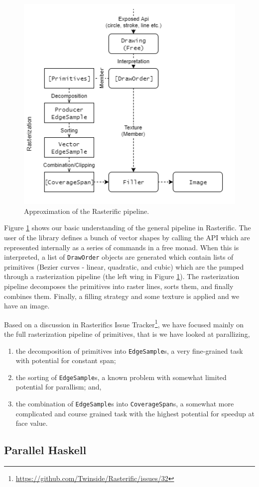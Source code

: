 \documentclass[12pt, a4paper]{article}
\begin{document}
\begin{figure}[h!]
  \centering
  \includegraphics[width=.4\linewidth]{../rasterific-pipeline}
  \caption{Approximation of the Rasterific pipeline.}
  \label{fig:rasterific-pipeline}
\end{figure}

Figure \ref{fig:rasterific-pipeline} shows our basic understanding of the general pipeline in Rasterific. The user of the library defines a bunch of vector shapes by calling the
API which are represented internally as a series of commands in a free monad. When this is interpreted, a list of \texttt{DrawOrder} objects are generated which contain lists
of primitives (Bezier curves - linear, quadratic, and cubic) which are the pumped through a rasterization pipeline (the left wing in Figure \ref{fig:rasterific-pipeline}). The rasterization
pipeline decomposes the primitives into raster lines, sorts them, and finally combines them. Finally, a filling strategy and some texture is applied and we have an image.

Based on a discussion in Rasterifics Issue Tracker\footnote{\url{https://github.com/Twinside/Rasterific/issues/32}}, we have focused mainly on the full rasterization pipeline of
primitives, that is we have looked at parallizing,
\begin{enumerate}
\item the decomposition of primitives into \texttt{EdgeSample}s, a very fine-grained task with potential for constant span;
\item the sorting of \texttt{EdgeSample}s, a known problem with somewhat limited potential for parallism; and,
\item the combination of \texttt{EdgeSample}s into \texttt{CoverageSpan}s, a somewhat more complicated and course grained task with the highest potential for speedup at face value.
\end{enumerate}

\subsection{Parallel Haskell}
\end{document}
